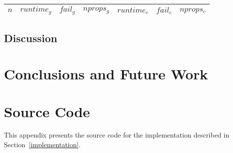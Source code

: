 \documentclass[a4paper,11pt]{article}
\newcommand{\Chapref}[1]{Section~\ref{#1}}
\numberwithin{equation}{section}
\begin{document}


\begin{table}[t] \tiny
  \centering
  \begin{tabular}{rrrrrrr}  %
    $n$ & $runtime_g$ & $fail_g$ & $nprops_g$ & $runtime_c$ & $fail_c$ & $nprops_c$ \\
    \midrule
  \end{tabular}
  \caption{}
  \label{tab:res:sat}
\end{table}


\subsection{Discussion}
\label{evaluation:discussion}



\section{Conclusions and Future Work}
\label{conclusions}




\appendix
\section{Source Code}
\label{sec:source-code}


This appendix presents the source code for the implementation described in \Chapref{implementation}.
\end{document}
